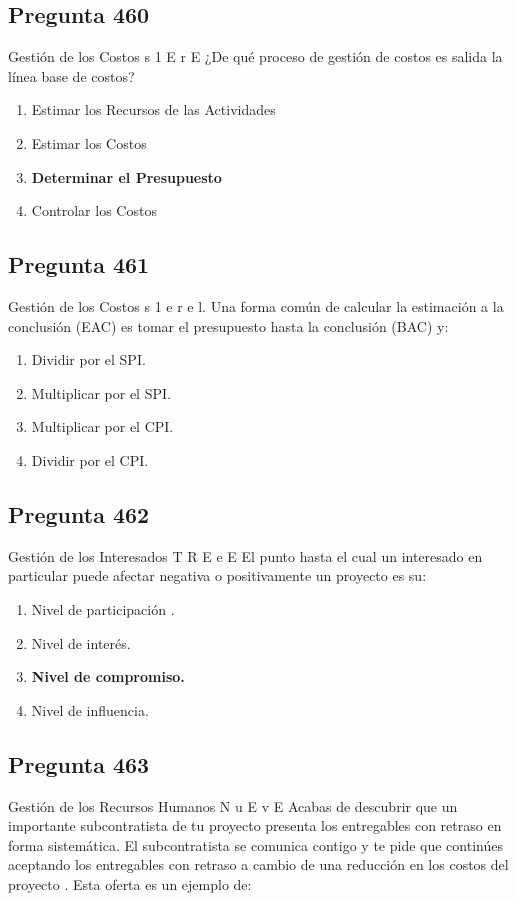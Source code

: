 \documentclass[11pt,a4paper]{article}
\begin{document}
\subsection*{Pregunta 460}
Gestión de los Costos s 1 E r E ¿De qué proceso de gestión de costos es salida la línea base de costos?

\begin{enumerate}[label=\alph*)]
  \item Estimar los Recursos de las Actividades
  \item Estimar los Costos
  \item \textbf{Determinar el Presupuesto}
  \item Controlar los Costos
\end{enumerate}

\subsection*{Pregunta 461}
Gestión de los Costos s 1 e r e l. Una forma común de calcular la estimación a la conclusión (EAC) es tomar el presupuesto hasta la conclusión (BAC) y:

\begin{enumerate}[label=\alph*)]
  \item Dividir por el SPI.
  \item Multiplicar por el SPI.
  \item Multiplicar por el CPI.
  \item Dividir por el CPI.
\end{enumerate}

\subsection*{Pregunta 462}
Gestión de los Interesados T R E e E El punto hasta el cual un interesado en particular puede afectar negativa o positivamente un proyecto es su:

\begin{enumerate}[label=\alph*)]
  \item Nivel de participación .
  \item Nivel de interés.
  \item \textbf{Nivel de compromiso.}
  \item Nivel de influencia.
\end{enumerate}

\subsection*{Pregunta 463}
Gestión de los Recursos Humanos N u E v E Acabas de descubrir que un importante subcontratista de tu proyecto presenta los entregables con retraso en forma sistemática. El subcontratista se comunica contigo y te pide que continúes aceptando los entregables con retraso a cambio de una reducción en los costos del proyecto . Esta oferta es un ejemplo de:
\end{document}
